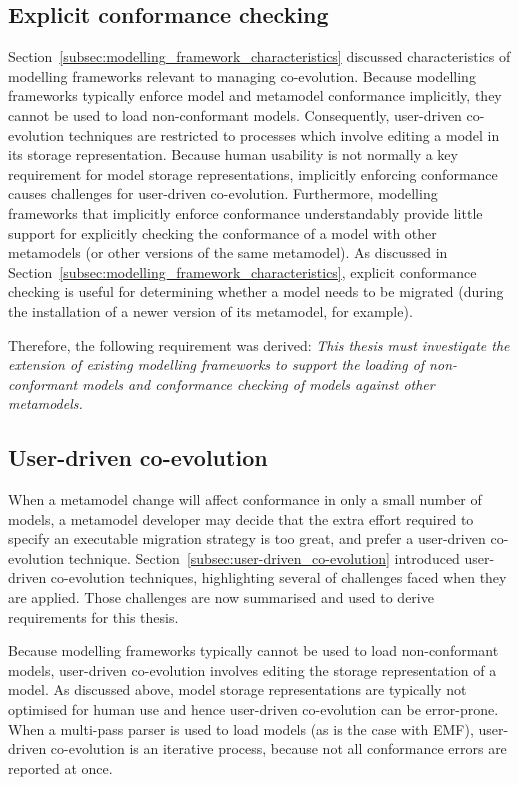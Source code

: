 \subsection{Explicit conformance checking}
Section~\ref{subsec:modelling_framework_characteristics} discussed characteristics of modelling frameworks relevant to managing co-evolution. Because modelling frameworks typically enforce model and metamodel conformance implicitly, they cannot be used to load non-conformant models. Consequently, user-driven co-evolution techniques are restricted to processes which involve editing a model in its storage representation. Because human usability is not normally a key requirement for model storage representations, implicitly enforcing conformance causes challenges for user-driven co-evolution. Furthermore, modelling frameworks that implicitly enforce conformance understandably provide little support for explicitly checking the conformance of a model with other metamodels (or other versions of the same metamodel). As discussed in Section~\ref{subsec:modelling_framework_characteristics}, explicit conformance checking is useful for determining whether a model needs to be migrated (during the installation of a newer version of its metamodel, for example).

Therefore, the following requirement was derived: \emph{This thesis must investigate the extension of existing modelling frameworks to support the loading of non-conformant models and conformance checking of models against other metamodels.}




\subsection{User-driven co-evolution}
When a metamodel change will affect conformance in only a small number of models, a metamodel developer may decide that the extra effort required to specify an executable migration strategy is too great, and prefer a user-driven co-evolution technique. Section~\ref{subsec:user-driven_co-evolution} introduced user-driven co-evolution techniques, highlighting several of challenges faced when they are applied. Those challenges are now summarised and used to derive requirements for this thesis.

Because modelling frameworks typically cannot be used to load non-conformant models, user-driven co-evolution involves editing the storage representation of a model. As discussed above, model storage representations are typically not optimised for human use and hence user-driven co-evolution can be error-prone. When a multi-pass parser is used to load models (as is the case with EMF), user-driven co-evolution is an iterative process, because not all conformance errors are reported at once.

